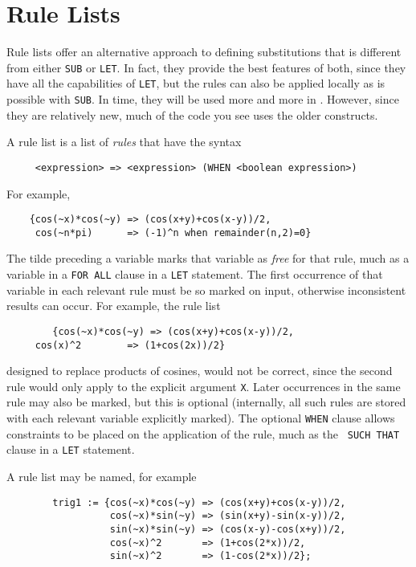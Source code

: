 \section{Rule Lists} 

Rule lists offer an alternative approach to defining substitutions that is
different from either {\tt SUB} or {\tt LET}.  In fact, they provide the
best features of both, since they have all the capabilities of {\tt LET},
but the rules can also be applied locally as is possible with {\tt SUB}.
In time, they will be used more and more in {\REDUCE}.  However, since they
are relatively new, much of the {\REDUCE} code you see uses the older
constructs.

\hypertarget{reserved:WHEN}{}
A rule list is a list of {\em rules\/} that have the syntax
\begin{verbatim}
     <expression> => <expression> (WHEN <boolean expression>)
\end{verbatim}
For example,
\begin{verbatim}
	{cos(~x)*cos(~y) => (cos(x+y)+cos(x-y))/2,
	 cos(~n*pi)      => (-1)^n when remainder(n,2)=0}
\end{verbatim}

The tilde preceding a variable marks that variable as {\em free\/} for that
rule, much as a variable in a {\tt FOR ALL} clause in a {\tt LET}
statement.  The first occurrence of that variable in each relevant rule
must be so marked on input, otherwise inconsistent results can occur.
For example, the rule list
\begin{verbatim}
        {cos(~x)*cos(~y) => (cos(x+y)+cos(x-y))/2,
	 cos(x)^2        => (1+cos(2x))/2}
\end{verbatim}
designed to replace products of cosines, would not be correct, since the
second rule would only apply to the explicit argument {\tt X}.  Later
occurrences in the same rule may also be marked, but this is optional
(internally, all such rules are stored with each relevant variable
explicitly marked).  The optional {\tt WHEN} clause allows
constraints to be placed on the application of the rule, much as the {\tt
SUCH THAT} clause in a {\tt LET} statement.

A rule list may be named, for example
\begin{verbatim}
        trig1 := {cos(~x)*cos(~y) => (cos(x+y)+cos(x-y))/2,
                  cos(~x)*sin(~y) => (sin(x+y)-sin(x-y))/2,
                  sin(~x)*sin(~y) => (cos(x-y)-cos(x+y))/2,
                  cos(~x)^2       => (1+cos(2*x))/2,
                  sin(~x)^2       => (1-cos(2*x))/2};
\end{verbatim}

